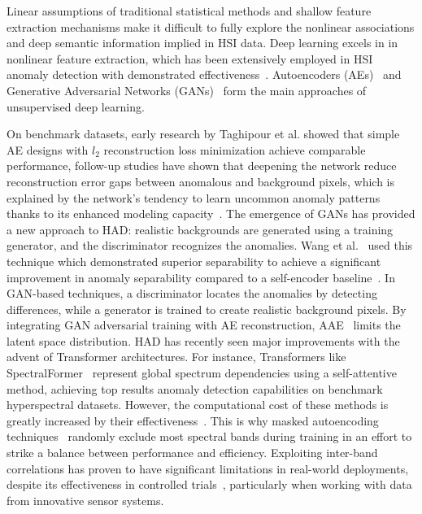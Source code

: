 Linear assumptions of traditional statistical methods and shallow feature extraction mechanisms make it difficult to fully explore the nonlinear associations and deep semantic information implied in HSI data. Deep learning excels in in nonlinear feature extraction, which has been extensively employed in HSI anomaly detection with demonstrated effectiveness~\cite{xu2022hyperspectral,xie2020autoencoder,Cui2025Pansharpening,sun2025decadedeeplearningremote}. Autoencoders (AEs)~\cite{zhang2016crop} and Generative Adversarial Networks (GANs)~\cite{jiang2020discriminative} form the main approaches of unsupervised deep learning.

On benchmark datasets, early research by Taghipour et al. showed that simple AE designs with $l_2$ reconstruction loss minimization achieve comparable performance, follow-up studies have shown that deepening the network reduce reconstruction error gaps between anomalous and background pixels, which is explained by the network's tendency to learn uncommon anomaly patterns thanks to its enhanced modeling capacity~\cite{taghipour2019unsupervised,wang2023digging,hartley2004minimization,Cui2024Reconstruction}. The emergence of GANs has provided a new approach to HAD: realistic backgrounds are generated using a training generator, and the discriminator recognizes the anomalies. Wang et al.~\cite{wang2023frequency} used this technique which demonstrated superior separability to achieve a significant improvement in anomaly separability compared to a self-encoder baseline~\cite{goodfellow2014generative,arjovsky2017wasserstein,xu2022hyperspectral,abuhani2025generative,Cui2024Pixel}. In GAN-based techniques, a discriminator locates the anomalies by detecting differences, while a generator is trained to create realistic background pixels. By integrating GAN adversarial training with AE reconstruction, AAE~\cite{xie2020autoencoder} limits the latent space distribution. HAD has recently seen major improvements with the advent of Transformer architectures. For instance, Transformers like SpectralFormer~\cite{wu2024transformer} represent global spectrum dependencies using a self-attentive method, achieving top results anomaly detection capabilities on benchmark hyperspectral datasets. However, the computational cost of these methods is greatly increased by their effectiveness~\cite{liu2024msnet}. This is why masked autoencoding techniques~\cite{vaswani2017attention} randomly exclude most spectral bands during training in an effort to strike a balance between performance and efficiency. Exploiting inter-band correlations has proven to have significant limitations in real-world deployments, despite its effectiveness in controlled trials~\cite{zhang2023spectrum}, particularly when working with data from innovative sensor systems.

